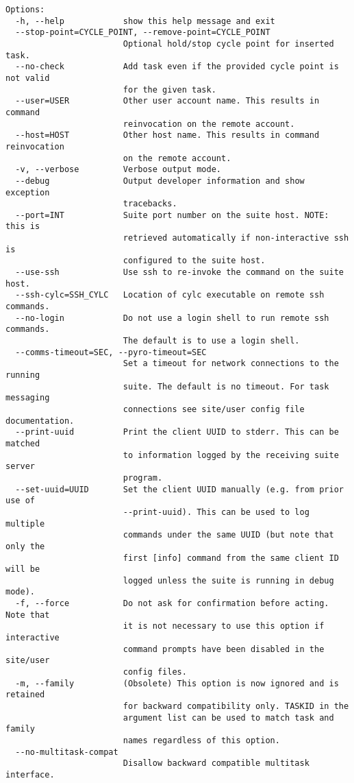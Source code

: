 \begin{lstlisting}
Options:
  -h, --help            show this help message and exit
  --stop-point=CYCLE_POINT, --remove-point=CYCLE_POINT
                        Optional hold/stop cycle point for inserted task.
  --no-check            Add task even if the provided cycle point is not valid
                        for the given task.
  --user=USER           Other user account name. This results in command
                        reinvocation on the remote account.
  --host=HOST           Other host name. This results in command reinvocation
                        on the remote account.
  -v, --verbose         Verbose output mode.
  --debug               Output developer information and show exception
                        tracebacks.
  --port=INT            Suite port number on the suite host. NOTE: this is
                        retrieved automatically if non-interactive ssh is
                        configured to the suite host.
  --use-ssh             Use ssh to re-invoke the command on the suite host.
  --ssh-cylc=SSH_CYLC   Location of cylc executable on remote ssh commands.
  --no-login            Do not use a login shell to run remote ssh commands.
                        The default is to use a login shell.
  --comms-timeout=SEC, --pyro-timeout=SEC
                        Set a timeout for network connections to the running
                        suite. The default is no timeout. For task messaging
                        connections see site/user config file documentation.
  --print-uuid          Print the client UUID to stderr. This can be matched
                        to information logged by the receiving suite server
                        program.
  --set-uuid=UUID       Set the client UUID manually (e.g. from prior use of
                        --print-uuid). This can be used to log multiple
                        commands under the same UUID (but note that only the
                        first [info] command from the same client ID will be
                        logged unless the suite is running in debug mode).
  -f, --force           Do not ask for confirmation before acting. Note that
                        it is not necessary to use this option if interactive
                        command prompts have been disabled in the site/user
                        config files.
  -m, --family          (Obsolete) This option is now ignored and is retained
                        for backward compatibility only. TASKID in the
                        argument list can be used to match task and family
                        names regardless of this option.
  --no-multitask-compat
                        Disallow backward compatible multitask interface.
\end{lstlisting}

